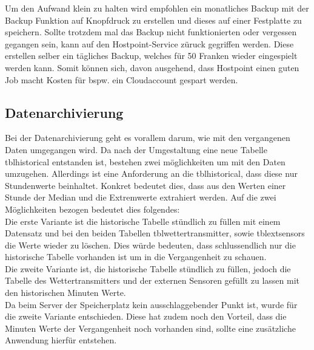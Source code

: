 Um den Aufwand klein zu halten wird empfohlen ein monatliches Backup mit der Backup Funktion auf Knopfdruck zu erstellen und dieses auf einer Festplatte zu speichern. Sollte trotzdem mal das Backup nicht funktionierten oder vergessen gegangen sein, kann auf den Hostpoint-Service züruck gegriffen werden. Diese erstellen selber ein tägliches Backup, welches für 50 Franken wieder eingespielt werden kann. Somit können sich, davon ausgehend, dass Hostpoint einen guten Job macht Kosten für bspw. ein Cloudaccount gespart werden.


\subsection{Datenarchivierung}

Bei der Datenarchivierung geht es vorallem darum, wie mit den vergangenen Daten umgegangen wird. Da nach der Umgestaltung eine neue Tabelle tblhistorical entstanden ist, bestehen zwei möglichkeiten um mit den Daten umzugehen. Allerdings ist eine Anforderung an die tblhistorical, dass diese nur Stundenwerte beinhaltet. Konkret bedeutet dies, dass aus den Werten einer Stunde der Median und die Extremwerte extrahiert werden. Auf die zwei Möglichkeiten bezogen bedeutet dies folgendes: \\
Die erste Variante ist die historische Tabelle stündlich zu füllen mit einem Datensatz und bei den beiden Tabellen tblwettertransmitter, sowie tblextsensors die Werte wieder zu löschen. Dies würde bedeuten, dass schlussendlich nur die historische Tabelle vorhanden ist um in die Vergangenheit zu schauen.\\
Die zweite Variante ist, die historische Tabelle stündlich zu füllen, jedoch die Tabelle des Wettertransmitters und der externen Sensoren gefüllt zu lassen mit den historischen Minuten Werte.\\
Da beim Server der Speicherplatz kein ausschlaggebender Punkt ist, wurde für die zweite Variante entschieden. Diese hat zudem noch den Vorteil, dass die Minuten Werte der Vergangenheit noch vorhanden sind, sollte eine zusätzliche Anwendung hierfür entstehen.


